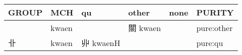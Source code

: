 \documentclass[14pt,a4paper]{scrartcl}
\begin{document}
\begin{longtable}[c]{@{}llllll@{}}
\toprule
\begin{minipage}[b]{0.14\columnwidth}\raggedright\strut
GROUP
\strut\end{minipage} &
\begin{minipage}[b]{0.14\columnwidth}\raggedright\strut
MCH
\strut\end{minipage} &
\begin{minipage}[b]{0.14\columnwidth}\raggedright\strut
qu
\strut\end{minipage} &
\begin{minipage}[b]{0.14\columnwidth}\raggedright\strut
other
\strut\end{minipage} &
\begin{minipage}[b]{0.14\columnwidth}\raggedright\strut
none
\strut\end{minipage} &
\begin{minipage}[b]{0.14\columnwidth}\raggedright\strut
PURITY
\strut\end{minipage}\tabularnewline
\midrule
\endhead
\begin{minipage}[t]{0.14\columnwidth}\raggedright\strut
𢇇
\strut\end{minipage} &
\begin{minipage}[t]{0.14\columnwidth}\raggedright\strut
kwaen
\strut\end{minipage} &
\begin{minipage}[t]{0.14\columnwidth}\raggedright\strut
\strut\end{minipage} &
\begin{minipage}[t]{0.14\columnwidth}\raggedright\strut
關 kwaen
\strut\end{minipage} &
\begin{minipage}[t]{0.14\columnwidth}\raggedright\strut
\strut\end{minipage} &
\begin{minipage}[t]{0.14\columnwidth}\raggedright\strut
pure:other
\strut\end{minipage}\tabularnewline
\begin{minipage}[t]{0.14\columnwidth}\raggedright\strut
卝
\strut\end{minipage} &
\begin{minipage}[t]{0.14\columnwidth}\raggedright\strut
kwaen
\strut\end{minipage} &
\begin{minipage}[t]{0.14\columnwidth}\raggedright\strut
丱 kwaenH
\strut\end{minipage} &
\begin{minipage}[t]{0.14\columnwidth}\raggedright\strut
\strut\end{minipage} &
\begin{minipage}[t]{0.14\columnwidth}\raggedright\strut
\strut\end{minipage} &
\begin{minipage}[t]{0.14\columnwidth}\raggedright\strut
pure:qu
\strut\end{minipage}\tabularnewline
\bottomrule
\end{longtable}
\end{document}
